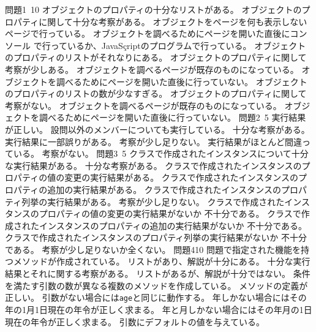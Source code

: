 {{問題1\hspace*{0.6zw}\newline\ \Must}{10}{
 {オブジェクトのプロパティの十分なリストがある。}
 {オブジェクトのプロパティに関して十分な考察がある。}
 {オブジェクトをページを何も表示しないページで行っている。}
 {オブジェクトを調べるためにページを開いた直後にコンソール
 で行っているか、JavaSçriptのプログラムで行っている。}
 }
 {
 {オブジェクトのプロパティのリストがそれなりにある。}
 {オブジェクトのプロパティに関して考察が少しある。}
 {オブジェクトを調べるページが既存のものになっている。}
 {オブジェクトを調べるためにページを開いた直後に行っていない。}
 }
 {
 {オブジェクトのプロパティのリストの数が少なすぎる。}
 {オブジェクトのプロパティに関して考察がない。}
 {オブジェクトを調べるページが既存のものになっている。}
 {オブジェクトを調べるためにページを開いた直後に行っていない。}
 }
 {問題2\hspace*{0.6zw}\newline\ \Must}{5}{
 {実行結果が正しい。}
 {設問以外のメンバーについても実行している。}
 {十分な考察がある。}
 }
 {
 {実行結果に一部誤りがある。}
 {考察が少し足りない。}
 }
 {
 {実行結果がほとんど間違っている。}
 {考察がない。}
 }
 {問題3\hspace*{0.6zw}\newline\ \Must}{5}{
 {クラスで作成されたインスタンスについて十分な実行結果がある。}
 {十分な考察がある。}
 }
 {
 {クラスで作成されたインスタンスのプロパティの値の変更の実行結果がある。}
 {クラスで作成されたインスタンスのプロパティの追加の実行結果がある。}
 {クラスで作成されたインスタンスのプロパティ列挙の実行結果がある。}
 {考察が少し足りない。}
 }
 {
 {クラスで作成されたインスタンスのプロパティの値の変更の実行結果がないか
 不十分である。}
 {クラスで作成されたインスタンスのプロパティの追加の実行結果がないか
 不十分である。}
 {クラスで作成されたインスタンスのプロパティ列挙の実行結果がないか
 不十分である。}
 {考察が少し足りないか全くない。}
 }
 {問題4}{10}{
 {問題で指定された機能を持つメソッドが作成されている。}
 {リストがあり、解説が十分にある。}
 {十分な実行結果とそれに関する考察がある。}
 }
 {
 {リストがあるが、解説が十分ではない。}
 {条件を満たす引数の数が異なる複数のメソッドを作成している。}
 {メソッドの定義が正しい。}
 {引数がない場合には\texttt{age}と同じに動作する。}
 {年しかない場合にはその年の1月1日現在の年令が正しく求まる。}
 {年と月しかない場合にはその年月の1日現在の年令が正しく求まる。}
 {引数にデフォルトの値を与えている。}
}}
